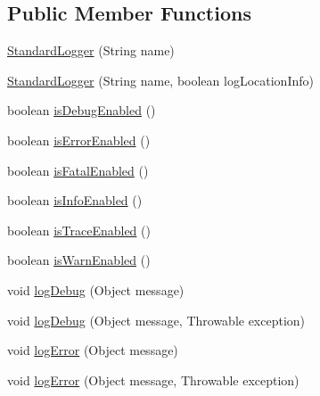 \subsection*{Public Member Functions}
\begin{DoxyCompactItemize}
\item 
\mbox{\hyperlink{classcom_1_1mysql_1_1jdbc_1_1log_1_1_standard_logger_ae1a2e1589d15daae2277ba71a4fd38fd}{Standard\+Logger}} (String name)
\item 
\mbox{\hyperlink{classcom_1_1mysql_1_1jdbc_1_1log_1_1_standard_logger_a76e2fb89ecf3c10a85509f908c875442}{Standard\+Logger}} (String name, boolean log\+Location\+Info)
\item 
boolean \mbox{\hyperlink{classcom_1_1mysql_1_1jdbc_1_1log_1_1_standard_logger_a0072ae8133e26e8422791592ea7724da}{is\+Debug\+Enabled}} ()
\item 
boolean \mbox{\hyperlink{classcom_1_1mysql_1_1jdbc_1_1log_1_1_standard_logger_a58e4e9a985cc55c3a1612588af36dcbf}{is\+Error\+Enabled}} ()
\item 
boolean \mbox{\hyperlink{classcom_1_1mysql_1_1jdbc_1_1log_1_1_standard_logger_ac51a86817ad34e81d451b8023e255845}{is\+Fatal\+Enabled}} ()
\item 
boolean \mbox{\hyperlink{classcom_1_1mysql_1_1jdbc_1_1log_1_1_standard_logger_a843810f899e33afae8e6ac8d579c32cf}{is\+Info\+Enabled}} ()
\item 
boolean \mbox{\hyperlink{classcom_1_1mysql_1_1jdbc_1_1log_1_1_standard_logger_ab41b3c2553938c1ed5d76a20aff834b4}{is\+Trace\+Enabled}} ()
\item 
boolean \mbox{\hyperlink{classcom_1_1mysql_1_1jdbc_1_1log_1_1_standard_logger_ad31d49920ae0271a16aafe7d8d31fc19}{is\+Warn\+Enabled}} ()
\item 
void \mbox{\hyperlink{classcom_1_1mysql_1_1jdbc_1_1log_1_1_standard_logger_a3b3bd15eb1f92d224a747ef52620cfdf}{log\+Debug}} (Object message)
\item 
void \mbox{\hyperlink{classcom_1_1mysql_1_1jdbc_1_1log_1_1_standard_logger_a136dd58baec91623e40b0a7c8d1d1872}{log\+Debug}} (Object message, Throwable exception)
\item 
void \mbox{\hyperlink{classcom_1_1mysql_1_1jdbc_1_1log_1_1_standard_logger_a8028fd5f19c7fce7b4568fbbe357d857}{log\+Error}} (Object message)
\item 
void \mbox{\hyperlink{classcom_1_1mysql_1_1jdbc_1_1log_1_1_standard_logger_a92546621212faa486bfeb5572e55a48a}{log\+Error}} (Object message, Throwable exception)
\item 

\end{DoxyCompactItemize}
